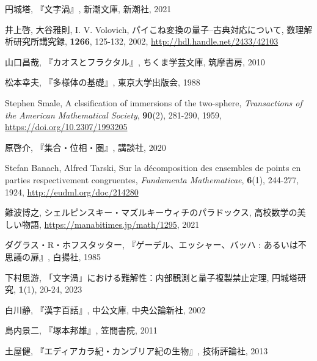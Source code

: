 \documentclass[10pt, a5paper, twoside]{jsarticle}
\theoremstyle{definition}
\begin{document}
	\begin{thebibliography}{99}

		 円城塔, 『文字渦』, 新潮文庫, 新潮社, 2021

		 井上啓, 大谷雅則, I. V. Volovich, パイこね変換の量子--古典対応について, 数理解析研究所講究録, \textbf{1266}, 125-132, 2002, \url{http://hdl.handle.net/2433/42103}

		 山口昌哉, 『カオスとフラクタル』, ちくま学芸文庫, 筑摩書房, 2010

		 松本幸夫, 『多様体の基礎』, 東京大学出版会, 1988

		 Stephen Smale, A clssification of immersions of the two-sphere, \textit{Transactions of the American Mathematical Society}, \textbf{90}(2), 281-290, 1959, \url{https://doi.org/10.2307/1993205}

		 原啓介, 『集合・位相・圏』, 講談社, 2020

		 Stefan Banach, Alfred Tarski, Sur la décomposition des ensembles de points en parties respectivement congruentes, \textit{Fundamenta Mathematicae}, \textbf{6}(1), 244-277, 1924, \url{http://eudml.org/doc/214280}

		 難波博之, シェルピンスキー・マズルキーウィチのパラドックス, 高校数学の美しい物語, \url{https://manabitimes.jp/math/1295}, 2021

		 ダグラス・R・ホフスタッター, 『ゲーデル、エッシャー、バッハ : あるいは不思議の扉』, 白揚社, 1985

		 下村思游, 「文字渦」における難解性：内部観測と量子複製禁止定理, 円城塔研究, \textbf{1}(1), 20-24, 2023


		 白川静, 『漢字百話』, 中公文庫, 中央公論新社, 2002

		 島内景二, 『塚本邦雄』, 笠間書院, 2011

		 土屋健, 『エディアカラ紀・カンブリア紀の生物』, 技術評論社, 2013

	\end{thebibliography}
\end{document}
